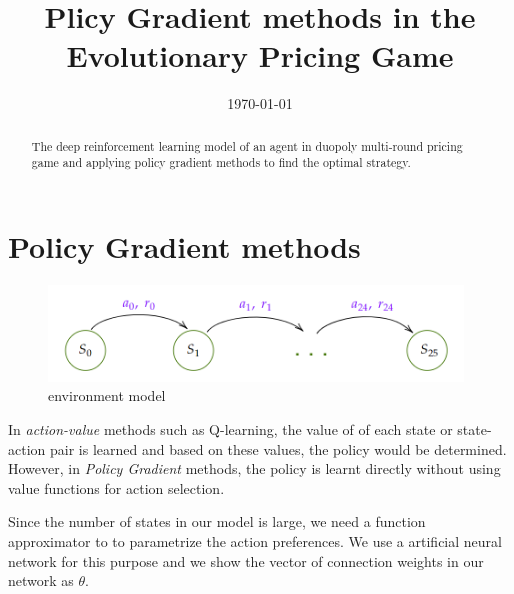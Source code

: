 \documentclass[a4paper,12pt]{article}  %
\title{%
	Plicy Gradient methods in the Evolutionary Pricing Game
}
\author{
}
\date{\today
	\\[1ex]
}
\theoremstyle{definition}
\begin{document}
	\maketitle
	
	\begin{abstract}
		The deep reinforcement learning model of an agent in duopoly multi-round pricing game and applying policy gradient methods to find the optimal strategy. 
		
	\end{abstract}
	
	\section{Policy Gradient methods}
	
	
	
	\begin{figure}[hbt]
		\centering
		\includegraphics[width=11cm]{states_model}
		\caption{environment model}
		\label{f1equi}
	\end{figure}
	
	In \textit{action-value} methods such as Q-learning, the value of of each state or state-action pair is learned and based on these values, the policy would be determined.
	However, in \textit{Policy Gradient} methods, the policy is learnt directly without using value functions for action selection.
	
	
	Since the number of states in our model is large, we need a function approximator to to parametrize the action preferences. We use a artificial neural network for this purpose and we show the vector of connection weights in our network as $ \theta $.
	
\end{document}
